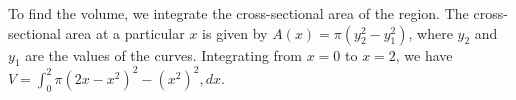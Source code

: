 To find the volume, we integrate the cross-sectional area of the region. The cross-sectional area at a particular $x$ is given by $A(x) = \pi(y_2^2 - y_1^2)$, where $y_2$ and $y_1$ are the values of the curves. Integrating from $x = 0$ to $x = 2$, we have $V = \int_{0}^{2} \pi(2x - x^2)^2 - (x^2)^2 , dx$.
